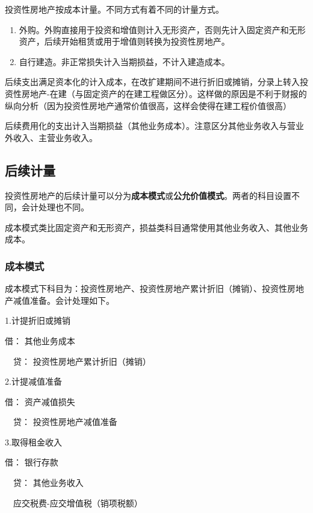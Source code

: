 \documentclass[UTF8,12pt]{ctexart}
\newenvironment{Dr}{\noindent 借：}{\par}
\newenvironment{Cr}{\noindent \ \ 贷：}{\par}
\numberwithin{equation}{section} %
\numberwithin{figure}{section}
\numberwithin{table}{section}
\begin{document}
	
	投资性房地产按成本计量。不同方式有着不同的计量方式。
	
	\begin{enumerate}
		\item 外购。外购直接用于投资和增值则计入无形资产，否则先计入固定资产和无形资产，后续开始租赁或用于增值则转换为投资性房地产。
		
		\item 自行建造。非正常损失计入当期损益，不计入建造成本。
	\end{enumerate}
	
	后续支出满足资本化的计入成本，在改扩建期间不进行折旧或摊销，分录上转入投资性房地产-在建（与固定资产的在建工程做区分）。这样做的原因是不利于财报的纵向分析（因为投资性房地产通常价值很高，这样会使得在建工程价值很高）
	
	后续费用化的支出计入当期损益（其他业务成本）。注意区分其他业务收入与营业外收入、主营业务收入。
	
	\subsection{后续计量}
	投资性房地产的后续计量可以分为\textbf{成本模式}或\textbf{公允价值模式}。两者的科目设置不同，会计处理也不同。
	
	成本模式类比固定资产和无形资产，损益类科目通常使用其他业务收入、其他业务成本。
	
	\subsubsection{成本模式}
	成本模式下科目为：投资性房地产、投资性房地产累计折旧（摊销）、投资性房地产减值准备。会计处理如下。
	
	1.计提折旧或摊销
	
	\begin{Dr}
		其他业务成本
	\end{Dr}
	\begin{Cr}
		投资性房地产累计折旧（摊销）
	\end{Cr}
	
	2.计提减值准备
	
	\begin{Dr}
		资产减值损失
	\end{Dr}
	\begin{Cr}
		投资性房地产减值准备
	\end{Cr}

	
	3.取得租金收入
	
	\begin{Dr}
		银行存款
	\end{Dr}
	\begin{Cr}
		其他业务收入
		
		\ \ 应交税费-应交增值税（销项税额）
	\end{Cr}
	
\end{document}
